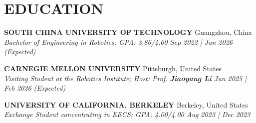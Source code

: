 \documentclass[a4paper,9pt]{extarticle}
\begin{document}
\section*{{\textbf{\fontsize{14pt}{8pt}\selectfont E}\textbf{\scshape DUCATION}}}
\textbf{SOUTH CHINA UNIVERSITY OF TECHNOLOGY} \hfill Guangzhou, China\\ %
\textit{Bachelor of Engineering in Robotics; GPA: 3.86/4.00  \hfill Sep 2022 | Jun 2026 (Expected)} %
\par\vspace{4pt}\noindent
\textbf{CARNEGIE MELLON UNIVERSITY} \hfill Pittsburgh, United States \\ %
\textit{Visiting Student at the Robotics Institute; Host: Prof. \textbf{Jiaoyang Li}  \hfill Jun 2025 | Feb 2026 (Expected)}  %
\par\vspace{4pt}\noindent
\textbf{UNIVERSITY OF CALIFORNIA, BERKELEY} \hfill Berkeley, United States\\ %
\textit{Exchange Student concentrating in EECS; GPA: 4.00/4.00 \hfill   Aug 2023 | Dec 2023} %



\end{document}
